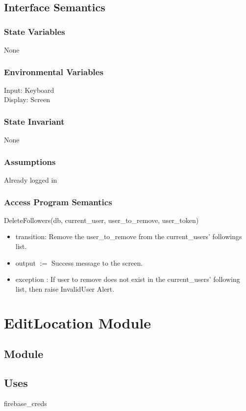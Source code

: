 \documentclass[12pt, titlepage]{article}
\begin{document}
\subsection{Interface Semantics}
\subsubsection{State Variables}
None

\subsubsection{Environmental Variables}
Input: Keyboard\\
Display: Screen

\subsubsection{State Invariant}
None

\subsubsection{Assumptions}
Already logged in

\subsubsection{Access Program Semantics}
DeleteFollowers(db, current\_user, user\_to\_remove, user\_token)
\begin{itemize}
    \item transition: Remove the user\_to\_remove from the current\_users' followings list.
    \item output $:= $ Success message to the screen.
    \item exception : If user to remove does not exist in the current\_users' following list, then raise InvalidUser Alert.
\end{itemize}






\newpage
\section* {EditLocation Module}

\subsection*{Module}

\subsection* {Uses}
firebase\_creds
\end{document}

